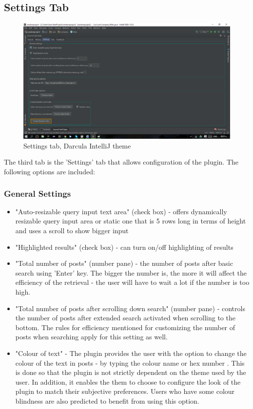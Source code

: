 \documentclass{l4proj}
\begin{document}
\subsection{Settings Tab}

\begin{figure}[H]
\includegraphics[scale=0.5]{tab-settings}
\centering
\caption{Settings tab, Darcula IntelliJ theme}
\label{fig:settings-tab}
\end{figure}

The third tab is the 'Settings' tab that allows configuration of the plugin. The following options are included:\\

\subsubsection{General Settings}
\begin{itemize}
\item "Auto-resizable query input text area" (check box) - offers dynamically resizable query input area or static one that is 5 rows long in terms of height and uses a scroll to show bigger input 
\item "Highlighted results" (check box) - can turn on/off highlighting of results
\item "Total number of posts" (number pane) - the number of posts after basic search using 'Enter' key. The bigger the number is, the more it will affect the efficiency of the retrieval - the user will have to wait a lot if the number is too high.
\item "Total number of posts after scrolling down search" (number pane) - controls the number of posts after extended search activated when scrolling to the bottom. The rules for efficiency mentioned for customizing the number of posts when searching apply for this setting as well.
\item "Colour of text" - The plugin provides the user with the option to change the colour of the text in posts - by typing the colour name or hex number \cite{htmlcolours}. This is done so that the plugin is not strictly dependent on the theme used by the user. In addition, it enables the them to choose to configure the look of the plugin to match their subjective preferences. Users who have some colour blindness are also predicted to  benefit from using this option.
\end{itemize}
\end{document}
